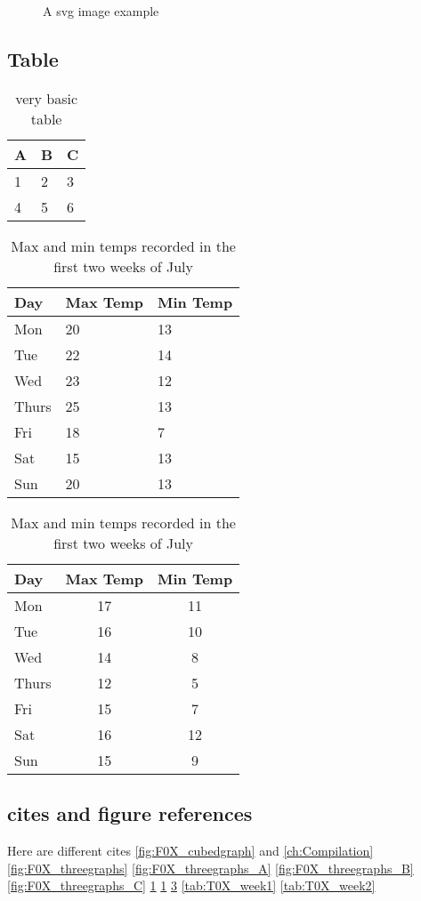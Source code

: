 \begin{figure}[ht]
\centering

\caption{A svg image example}
\label{fig:F0X_svg}
\end{figure}



\subsection{Table}


\begin{table}[ht]
\centering
\begin{tabular}{l | l | l}
A & B & C \\
\hline
1 & 2 & 3 \\
4 & 5 & 6
\end{tabular}
\caption{very basic table}
\label{tab:T0X_abc}
\end{table}


\begin{table}[ht]
    \begin{subtable}[h]{0.45\textwidth}
        \centering
        \begin{tabular}{l | l | l}
        Day & Max Temp & Min Temp \\
        \hline \hline
        Mon & 20 & 13\\
        Tue & 22 & 14\\
        Wed & 23 & 12\\
        Thurs & 25 & 13\\
        Fri & 18 & 7\\
        Sat & 15 & 13\\
        Sun & 20 & 13
        \end{tabular}
        \caption{First Week}
        \label{tab:T0X_week1}
    \end{subtable}
    \hfill
    \begin{subtable}[h]{0.45\textwidth}
        \centering
        \begin{tabular}{l | c | c}
        Day & Max Temp & Min Temp \\
        \hline \hline
        Mon & 17 & 11\\
        Tue & 16 & 10\\
        Wed & 14 & 8\\
        Thurs & 12 & 5\\
        Fri & 15 & 7\\
        Sat & 16 & 12\\
        Sun & 15 & 9
        \end{tabular}
        \caption{Second Week}
        \label{tab:T0X_week2}
    \end{subtable}
    \caption{Max and min temps recorded in the first two weeks of July}
    \label{tab:T0X_week}
\end{table}
\subsection{cites and figure references}
Here are different cites \cite{Geisz2015} \ref{fig:F0X_cubedgraph} and \ref{ch:Compilation}
\ref{fig:F0X_threegraphs}
\ref{fig:F0X_threegraphs_A}
\ref{fig:F0X_threegraphs_B}
\ref{fig:F0X_threegraphs_C}
\ref{fig:F0X_svg}
\ref{tab:T0X_abc}
\ref{tab:T0X_week}
\ref{tab:T0X_week1}
\ref{tab:T0X_week2}
